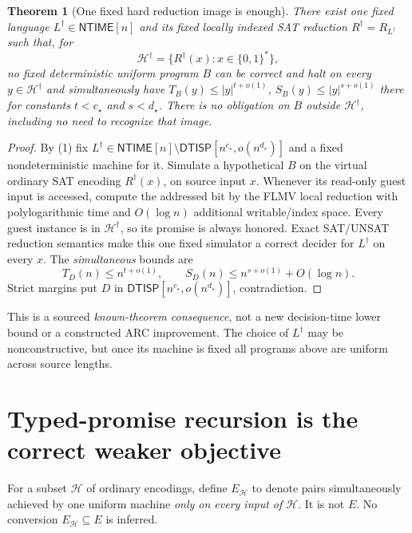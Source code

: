 \documentclass[11pt]{article}
\newtheorem{theorem}{Theorem}
\newcommand{\NTIME}{\mathsf{NTIME}}
\newcommand{\DTISP}{\mathsf{DTISP}}
\begin{document}
\begin{theorem}[One fixed hard reduction image is enough]\label{th:single}
There exist one fixed language $L^\dagger\in\NTIME[n]$ and its fixed locally
indexed SAT reduction $R^\dagger=R_{L^\dagger}$ such that, for
\[
\mathcal H^\dagger=\{R^\dagger(x):x\in\{0,1\}^{*}\},
\]
no fixed deterministic uniform program $B$ can be correct and halt on
\emph{every} $y\in\mathcal H^\dagger$ and simultaneously have
$T_B(y)\le |y|^{t+o(1)}$, $S_B(y)\le |y|^{s+o(1)}$ there for constants
$t<c_\star$ and $s<d_\star$. There is no obligation on $B$ outside
$\mathcal H^\dagger$, including no need to recognize that image.
\end{theorem}
\begin{proof}
By (1) fix
$L^\dagger\in\NTIME[n]\setminus\DTISP[n^{c_\star},o(n^{d_\star})]$
and a fixed nondeterministic machine for it. Simulate a hypothetical
$B$ on the virtual ordinary SAT encoding $R^\dagger(x)$, on source input $x$.
Whenever its read-only guest input is accessed, compute the addressed bit by
the FLMV local reduction with polylogarithmic time and $O(\log n)$ additional
writable/index space. Every guest instance is in $\mathcal H^\dagger$, so
its promise is always honored. Exact SAT/UNSAT reduction semantics make
this one fixed simulator a correct decider for $L^\dagger$ on every $x$.
The \emph{simultaneous} bounds are
\[
T_D(n)\le n^{t+o(1)},\qquad
S_D(n)\le n^{s+o(1)}+O(\log n).
\]
Strict margins put $D$ in
$\DTISP[n^{c_\star},o(n^{d_\star})]$, contradiction.
\end{proof}
This is a sourced \emph{known-theorem consequence}, not a new
decision-time lower bound or a constructed ARC improvement.
The choice of $L^\dagger$ may be nonconstructive, but once its machine is
fixed all programs above are uniform across source lengths.

\section{Typed-promise recursion is the correct weaker objective}
For a subset $\mathcal H$ of ordinary encodings, define
$E_{\mathcal H}$ to denote pairs simultaneously achieved by one uniform
machine \emph{only on every input of $\mathcal H$}. It is not $E$.
No conversion $E_{\mathcal H}\subseteq E$ is inferred.
\end{document}
